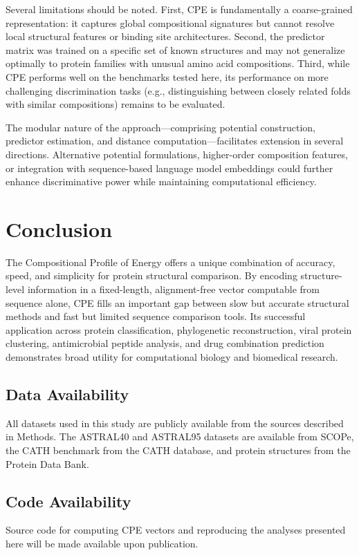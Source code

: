\documentclass[11pt]{article}
\begin{document}
Several limitations should be noted. First, CPE is fundamentally a coarse-grained representation: it captures global compositional signatures but cannot resolve local structural features or binding site architectures. Second, the predictor matrix was trained on a specific set of known structures and may not generalize optimally to protein families with unusual amino acid compositions. Third, while CPE performs well on the benchmarks tested here, its performance on more challenging discrimination tasks (e.g., distinguishing between closely related folds with similar compositions) remains to be evaluated.

The modular nature of the approach---comprising potential construction, predictor estimation, and distance computation---facilitates extension in several directions. Alternative potential formulations, higher-order composition features, or integration with sequence-based language model embeddings could further enhance discriminative power while maintaining computational efficiency.

\section{Conclusion}

The Compositional Profile of Energy offers a unique combination of accuracy, speed, and simplicity for protein structural comparison. By encoding structure-level information in a fixed-length, alignment-free vector computable from sequence alone, CPE fills an important gap between slow but accurate structural methods and fast but limited sequence comparison tools. Its successful application across protein classification, phylogenetic reconstruction, viral protein clustering, antimicrobial peptide analysis, and drug combination prediction demonstrates broad utility for computational biology and biomedical research.

\subsection*{Data Availability}
All datasets used in this study are publicly available from the sources described in Methods. The ASTRAL40 and ASTRAL95 datasets are available from SCOPe, the CATH benchmark from the CATH database, and protein structures from the Protein Data Bank.

\subsection*{Code Availability}
Source code for computing CPE vectors and reproducing the analyses presented here will be made available upon publication.



\end{document}
